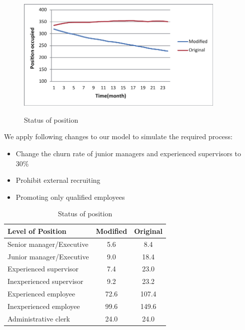 \documentclass[12pt,a4paper,titlepage]{article}
\begin{document}
\begin{figure}[htb]
  \centering
  \includegraphics[width=10cm]{task5_p.pdf}\\
  \caption{Status of position}\label{t5_p}
\end{figure}
We apply following changes to our model to simulate the required process:\\
\begin{itemize}
\item Change the churn rate of junior managers and experienced supervisors to 30\%
\item Prohibit external recruiting
\item Promoting only qualified employees
\end{itemize}
\begin{table}
        \begin{center}
                \begin{tabular}{lcc}\toprule[2pt]
                \bfseries Level of Position & \bfseries Modified & \bfseries Original\\ \midrule
                Senior manager/Executive & 5.6 & 8.4\\
                Junior manager/Executive & 9.0 & 18.4\\
                Experienced supervisor & 7.4 & 23.0\\
                Inexperienced supervisor & 9.2 & 23.2\\
                Experienced employee & 72.6 & 107.4\\
                Inexperienced employee & 99.6 & 149.6\\
                Administrative clerk & 24.0 & 24.0\\ \bottomrule[2pt]
                \end{tabular}
                \caption{Status of position}\label{t5_p_t}
        \end{center}
\end{table}
\end{document}
